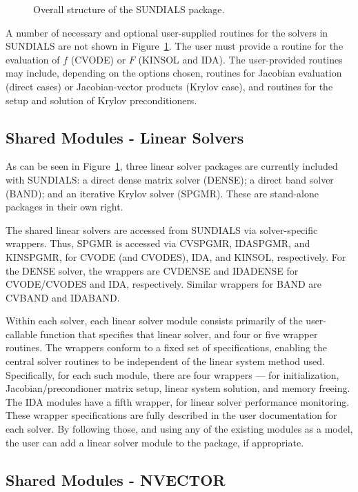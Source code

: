 \begin{figure}[tp]
\centerline{}
\caption{Overall structure of the SUNDIALS  package.}
\label{fig-sunorg}
\end{figure}

A number of necessary and optional user-supplied routines for the solvers
in SUNDIALS
are not shown in \mbox{Figure \ref{fig-sunorg}}. The user must
provide a routine for the evaluation of $f$ (CVODE) or $F$ (KINSOL and
IDA). The user-provided routines may include, depending on the options
chosen, routines for Jacobian evaluation (direct cases) or Jacobian-vector
products (Krylov case), and routines for the setup and solution of Krylov
preconditioners.


\subsection{Shared Modules - Linear Solvers}

As can be seen in \mbox{Figure \ref{fig-sunorg}}, three linear solver
packages are currently included with SUNDIALS: a direct dense matrix solver
(DENSE); a direct band solver (BAND); and an iterative Krylov solver
(SPGMR). These are stand-alone packages in their own right.

The shared linear solvers are accessed from SUNDIALS via solver-specific
wrappers.  Thus, SPGMR is accessed via CVSPGMR, IDASPGMR, and KINSPGMR,
for CVODE (and CVODES), IDA, and KINSOL, respectively. For the DENSE
solver, the wrappers are CVDENSE and IDADENSE for CVODE/CVODES and
IDA, respectively. Similar wrappers for BAND are CVBAND and IDABAND.

Within each solver, each linear solver module consists primarily of the
user-callable function that specifies that linear solver, and four or five
wrapper routines.  The wrappers conform to a fixed set of specifications,
enabling the central solver routines to be independent of the linear
system method used.  Specifically, for each such module, there are
four wrappers --- for initialization, Jacobian/precondioner matrix
setup, linear system solution, and memory freeing.  The IDA modules
have a fifth wrapper, for linear solver performance monitoring.  These
wrapper specifications are fully described in the user documentation
for each solver.  By following those, and using any of the existing modules
as a model, the user can add a linear solver module to the package, if
appropriate.

\subsection{Shared Modules - NVECTOR}

